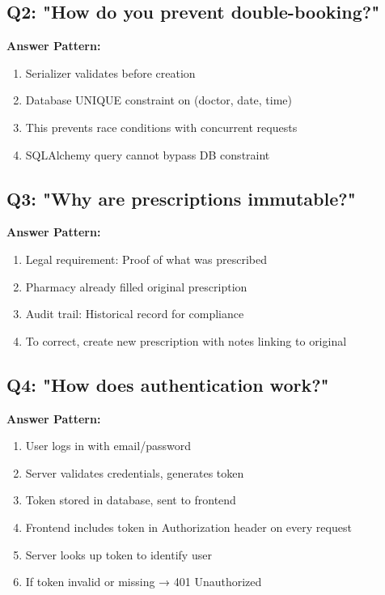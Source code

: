 \documentclass[11pt,a4paper,twoside]{report}
\begin{document}
\subsection*{Q2: "How do you prevent double-booking?"}

\textbf{Answer Pattern:}
\begin{enumerate}
    \item Serializer validates before creation
    \item Database UNIQUE constraint on (doctor, date, time)
    \item This prevents race conditions with concurrent requests
    \item SQLAlchemy query cannot bypass DB constraint
\end{enumerate}

\subsection*{Q3: "Why are prescriptions immutable?"}

\textbf{Answer Pattern:}
\begin{enumerate}
    \item Legal requirement: Proof of what was prescribed
    \item Pharmacy already filled original prescription
    \item Audit trail: Historical record for compliance
    \item To correct, create new prescription with notes linking to original
\end{enumerate}

\subsection*{Q4: "How does authentication work?"}

\textbf{Answer Pattern:}
\begin{enumerate}
    \item User logs in with email/password
    \item Server validates credentials, generates token
    \item Token stored in database, sent to frontend
    \item Frontend includes token in Authorization header on every request
    \item Server looks up token to identify user
    \item If token invalid or missing → 401 Unauthorized
\end{enumerate}
\end{document}
